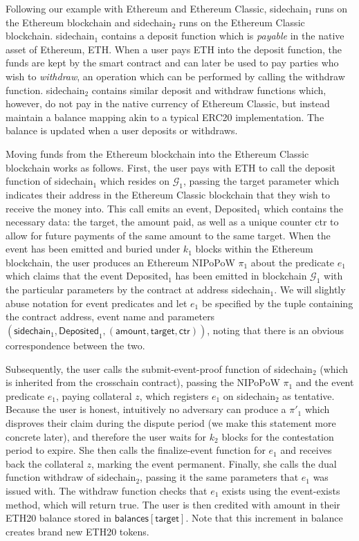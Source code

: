 Following our example with Ethereum and Ethereum Classic, \textsf{sidechain}$_1$
runs on the Ethereum blockchain and \textsf{sidechain}$_2$ runs on the Ethereum
Classic blockchain. \textsf{sidechain}$_1$ contains a \textsf{deposit} function
which is \emph{payable} in the native asset of Ethereum, ETH. When a user pays
ETH into the \textsf{deposit} function, the funds are kept by the smart contract
and can later be used to pay parties who wish to \emph{withdraw}, an operation
which can be performed by calling the \textsf{withdraw} function.
\textsf{sidechain}$_2$ contains similar \textsf{deposit} and \textsf{withdraw}
functions which, however, do not pay in the native currency of Ethereum Classic,
but instead maintain a \textsf{balance} mapping akin to a typical ERC20
implementation. The balance is updated when a user deposits or withdraws.

Moving funds from the Ethereum blockchain into the Ethereum Classic blockchain
works as follows. First, the user pays with ETH to call the \textsf{deposit}
function of \textsf{sidechain}$_1$ which resides on $\mathcal{G}_1$, passing the
\textsf{target} parameter which indicates their address in the Ethereum Classic
blockchain that they wish to receive the money into. This call emits an event,
\textsf{Deposited}$_1$ which contains the necessary data: the \textsf{target},
the \textsf{amount} paid, as well as a unique counter \textsf{ctr} to allow for
future payments of the same amount to the same target. When the event has been
emitted and buried under $k_1$ blocks within the Ethereum blockchain, the user
produces an Ethereum NIPoPoW $\pi_1$ about the predicate $e_1$ which claims that
the event \textsf{Deposited}$_1$ has been emitted in blockchain $\mathcal{G}_1$
with the particular parameters by the contract at address
\textsf{sidechain}$_1$. We will slightly abuse notation for event predicates and
let $e_1$ be specified by the tuple containing the contract address, event name
and parameters $(\textsf{sidechain}_1, \textsf{Deposited}_1, (\textsf{amount},
\textsf{target}, \textsf{ctr}))$, noting that there is an obvious correspondence
between the two.

Subsequently, the user calls the \textsf{submit-event-proof} function of
\textsf{sidechain}$_2$ (which is inherited from the \textsf{crosschain}
contract), passing the NIPoPoW $\pi_1$ and the event predicate $e_1$, paying
collateral $z$, which registers $e_1$ on \textsf{sidechain}$_2$ as tentative.
Because the user is honest, intuitively no adversary can produce a $\pi'_1$
which disproves their claim during the dispute period (we make this statement
more concrete later), and therefore the user waits for $k_2$ blocks for the
contestation period to expire. She then calls the \textsf{finalize-event}
function for $e_1$ and receives back the collateral $z$, marking the event
permanent. Finally, she calls the dual function \textsf{withdraw} of
\textsf{sidechain}$_2$, passing it the same parameters that $e_1$ was issued
with. The \textsf{withdraw} function checks that $e_1$ exists using the
\textsf{event-exists} method, which will return \textsf{true}. The user is then
credited with \textsf{amount} in their ETH20 balance stored in
$\textsf{balances}[\textsf{target}]$. Note that this increment in balance
creates brand new ETH20 tokens.

